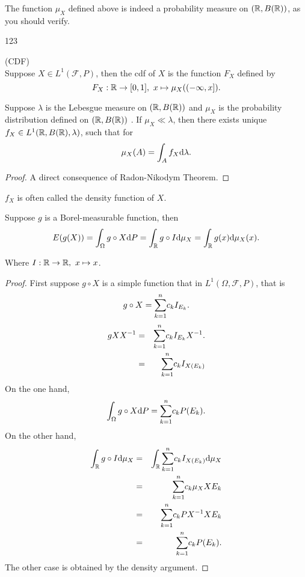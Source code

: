 The function $\mu_X$ defined above is indeed a probability measure on $(\mathbb{R},B(\mathbb{R}))$, as you should verify.
\begin{remark}
	123
\end{remark}
\begin{definition}(CDF) \\
Suppose $X \in L^1(\mathcal F,P)$, then the cdf of $X$ is the function $F_X$ defined by
$$
F_X:\mathbb{R} \to [0,1], \ x \mapsto \mu_X((-\infty,x]).
$$
\end{definition}
\begin{proposition}
Suppose $\lambda$ is the Lebesgue measure on $(\mathbb{R},B(\mathbb{R}))$ and $\mu_X$ is the probability distribution defined on $(\mathbb{R},B(\mathbb{R}))$	. If $\mu_X \ll \lambda$, then 
there exists unique $f_X\in L^1(\mathbb{R},B(\mathbb{R}),\lambda)$, such that for
$$
\mu_X(A) = \int_A f_X \mathrm{d} \lambda.
$$
\end{proposition}
\begin{proof}
A direct consequence of Radon-Nikodym Theorem. 	
\end{proof}
\begin{remark}
$f_X$ is often called the density function of $X$.
\end{remark}

\begin{theorem}[Expectation] Suppose $g$ is a Borel-measurable function, then
$$
E(g(X))=\int_\Omega g\circ X \mathrm{d} P = \int_{\mathbb{R}} g\circ I \mathrm{d} \mu_X = \int_{\mathbb{R}} g(x) \mathrm{d} \mu_X(x).
$$
\end{theorem}
Where $I: \mathbb{R} \to \mathbb{R}, \ x \mapsto x$.
\begin{proof}
First suppose $g \circ X$ is a simple function that in $L^1(\Omega,\mathcal F,P)$, that is 
$$
g \circ X = {\sum_{k=1}^{n}} c_k I_{E_k}.
$$	
\begin{eqnarray*}
	g X X^{-1} &=& {\sum_{k=1}^{n}} c_k I_{E_k}X^{-1}. \\
	&=& {\sum_{k=1}^{n}} c_k I_{X(E_k)}
\end{eqnarray*}
On the one hand, 
$$
\int_\Omega g\circ X \mathrm{d} P = {\sum_{k=1}^{n}} c_k P(E_k).
$$
On the other hand, 
\begin{eqnarray*}
\int_{\mathbb{R}} g\circ I \mathrm{d} \mu_X &=& \int_{\mathbb{R}} {\sum_{k=1}^{n}} c_k I_{X(E_k)} \mathrm{d} \mu_X \\
&=& {\sum_{k=1}^{n}} c_k \mu_X XE_k \\
&=& {\sum_{k=1}^{n}} c_k P X^{-1} X E_k \\
&=& {\sum_{k=1}^{n}} c_k P(E_k).
\end{eqnarray*}
The other case is obtained by the density argument.
\end{proof}




